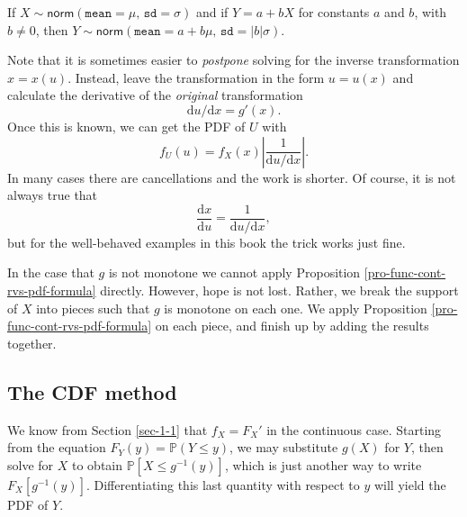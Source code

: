 \documentclass[captions=tableheading]{scrbook}
\begin{document}
\begin{fact}
If \(X\sim\mathsf{norm}(\mathtt{mean}=\mu,\,\mathtt{sd}=\sigma)\) and if \(Y=a+bX\) for constants \(a\) and \(b\), with \(b\neq0\), then \(Y\sim\mathsf{norm}(\mathtt{mean}=a+b\mu,\,\mathtt{sd}=|b|\sigma)\). 
\end{fact}

Note that it is sometimes easier to \emph{postpone} solving for the inverse transformation \(x=x(u)\). Instead, leave the transformation in the form \(u=u(x)\) and calculate the derivative of the \emph{original} transformation
\begin{equation}
\mathrm{d} u/\mathrm{d} x=g'(x).
\end{equation}
Once this is known, we can get the PDF of \(U\) with
\begin{equation}
f_{U}(u)=f_{X}(x)\left|\frac{1}{\mathrm{d} u/\mathrm{d} x}\right|.
\end{equation}
In many cases there are cancellations and the work is shorter. Of course, it is not always true that
\begin{equation}
\frac{\mathrm{d} x}{\mathrm{d} u}=\frac{1}{\mathrm{d} u/\mathrm{d} x},\label{eq-univ-jacob-recip}
\end{equation}
but for the well-behaved examples in this book the trick works just fine.

\begin{rem}
In the case that \(g\) is not monotone we cannot apply Proposition \ref{pro-func-cont-rvs-pdf-formula} directly. However, hope is not lost. Rather, we break the support of \(X\) into pieces such that \(g\) is monotone on each one. We apply Proposition \ref{pro-func-cont-rvs-pdf-formula} on each piece, and finish up by adding the results together.
\end{rem}
\subsection{The CDF method}
\label{sec-1-4-2}


We know from Section \ref{sec-1-1} that \(f_{X}=F_{X}'\) in the continuous case. Starting from the equation \(F_{Y}(y)=\mathbb{P}(Y\leq y)\), we may substitute \(g(X)\) for \(Y\), then solve for \(X\) to obtain \(\mathbb{P}[X\leq g^{-1}(y)]\), which is just another way to write \(F_{X}[g^{-1}(y)]\). Differentiating this last quantity with respect to \(y\) will yield the PDF of \(Y\).
\end{document}

